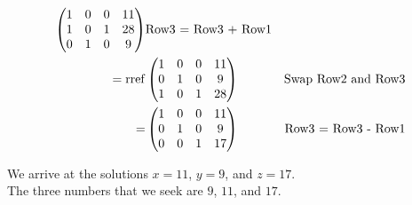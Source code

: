 \documentclass{article}
\begin{document}
\begin{align*}
\begin{pmatrix}
1 & 0 & 0 & 11 \\
1 & 0 & 1 & 28 \\
0 & 1 & 0 & 9
\end{pmatrix} & \text{Row3 = Row3 + Row1} \\
= \mathop{\rm rref} & \begin{pmatrix}
1 & 0 & 0 & 11 \\
0 & 1 & 0 & 9 \\
1 & 0 & 1 & 28 
\end{pmatrix} & \text{Swap Row2 and Row3} \\
= & \begin{pmatrix}
1 & 0 & 0 & 11 \\
0 & 1 & 0 & 9 \\
0 & 0 & 1 & 17 
\end{pmatrix} & \text{Row3 = Row3 - Row1} \\
\end{align*}

We arrive at the solutions $x = 11$, $y = 9$, and $z = 17$. \\

The three numbers that we seek are $9$, $11$, and $17$.
\end{document}
